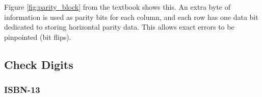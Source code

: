 \documentclass[../main.tex]{subfiles}
\begin{document}
Figure \ref{fig:parity_block} from the textbook shows this. An extra byte of information is used as parity bits for each column, and each row has one data bit dedicated to storing horizontal parity data. This allows exact errors to be pinpointed (bit flips).

\subsection{Check Digits}

\subsubsection{ISBN-13}
\end{document}
